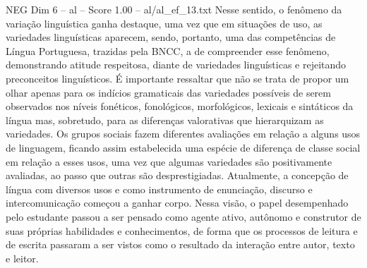 \begin{textsample}{NEG Dim 6 – al – Score 1.00 – al/al\_ef\_13.txt}
Nesse sentido, o fenômeno da variação linguística ganha destaque, uma vez que em situações de uso, as variedades linguísticas aparecem, sendo, portanto, uma das competências de Língua Portuguesa, trazidas pela BNCC, a de compreender esse fenômeno, demonstrando atitude respeitosa, diante de variedades linguísticas e rejeitando preconceitos linguísticos.
É importante ressaltar que não se trata de propor um olhar apenas para os indícios gramaticais das variedades possíveis de serem observados nos níveis fonéticos, fonológicos, morfológicos, lexicais e sintáticos da língua mas, sobretudo, para as diferenças valorativas que hierarquizam as variedades.
Os grupos sociais fazem diferentes avaliações em relação a alguns usos de linguagem, ficando assim estabelecida uma espécie de diferença de classe social em relação a esses usos, uma vez que algumas variedades são positivamente avaliadas, ao passo que outras são desprestigiadas.
Atualmente, a concepção de língua com diversos usos e como instrumento de enunciação, discurso e intercomunicação começou a ganhar corpo.
Nessa visão, o papel desempenhado pelo estudante passou a ser pensado como agente ativo, autônomo e construtor de suas próprias habilidades e conhecimentos, de forma que os processos de leitura e de escrita passaram a ser vistos como o resultado da interação entre autor, texto e leitor.

\end{textsample}
